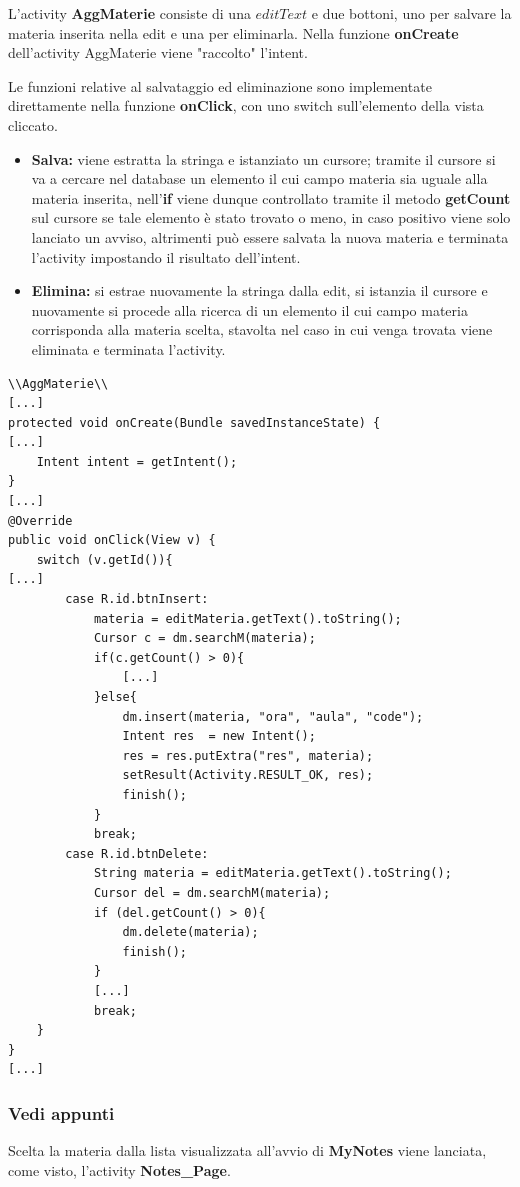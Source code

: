 \documentclass[a4paper, 50pt, twoside]{article}
\begin{document}
L'activity \textbf{AggMaterie} consiste di una $editText$ e due bottoni, uno per salvare la materia inserita nella edit e una per eliminarla.
Nella funzione \textbf{onCreate} dell'activity AggMaterie viene "raccolto" l'intent.

Le funzioni relative al salvataggio ed eliminazione sono implementate direttamente nella funzione \textbf{onClick}, con uno switch sull'elemento della vista cliccato.
\begin{itemize}
\item \textbf{Salva:} viene estratta la stringa e istanziato un cursore; tramite il cursore si va a cercare nel database un elemento il cui campo materia sia uguale alla materia inserita, nell'\textbf{if} viene dunque controllato tramite il metodo \textbf{getCount} sul cursore se tale elemento è stato trovato o meno, in caso positivo viene solo lanciato un avviso, altrimenti può essere salvata la nuova materia e terminata l'activity impostando il risultato dell'intent.
\item \textbf{Elimina:} si estrae nuovamente la stringa dalla edit, si istanzia il cursore e nuovamente si procede alla ricerca di un elemento il cui campo materia corrisponda alla materia scelta, stavolta nel caso in cui venga trovata viene eliminata e terminata l'activity.
\end{itemize}

\begin{lstlisting}
\\AggMaterie\\
[...]
protected void onCreate(Bundle savedInstanceState) {
[...]
	Intent intent = getIntent();
}
[...]
@Override
public void onClick(View v) {
	switch (v.getId()){
[...]
		case R.id.btnInsert:
			materia = editMateria.getText().toString();
			Cursor c = dm.searchM(materia);
			if(c.getCount() > 0){
				[...]
			}else{
				dm.insert(materia, "ora", "aula", "code");
				Intent res  = new Intent();
				res = res.putExtra("res", materia);
				setResult(Activity.RESULT_OK, res);	
				finish();
			}
			break;
		case R.id.btnDelete:
			String materia = editMateria.getText().toString();
			Cursor del = dm.searchM(materia);
			if (del.getCount() > 0){
				dm.delete(materia);
				finish();
			}
			[...]
			break;
	}
}
[...]
\end{lstlisting}

\subsubsection{Vedi appunti}
Scelta la materia dalla lista visualizzata all'avvio di \textbf{MyNotes} viene lanciata, come visto, l'activity \textbf{Notes\_Page}.
\end{document}
